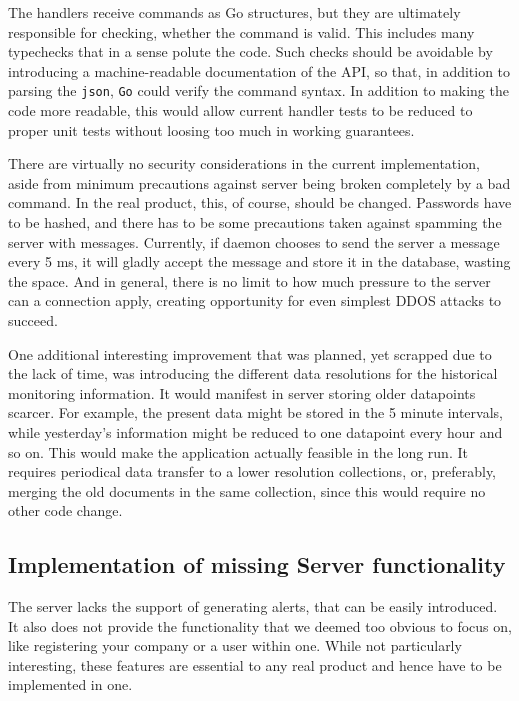 \documentclass{l3proj}
\begin{document}
The handlers receive commands as Go structures, but they are ultimately responsible for checking, whether the command is valid. This includes many typechecks that in a sense polute the code. Such checks should be avoidable by introducing a machine-readable documentation of the API, so that, in addition to parsing the \texttt{json}, \texttt{Go} could verify the command syntax. In addition to making the code more readable, this would allow current handler tests to be reduced to proper unit tests without loosing too much in working guarantees.

There are virtually no security considerations in the current implementation, aside from minimum precautions against server being broken completely by a bad command. In the real product, this, of course, should be changed. Passwords have to be hashed, and there has to be some precautions taken against spamming the server with messages. Currently, if daemon chooses to send the server a message every 5 ms, it will gladly accept the message and store it in the database, wasting the space. And in general, there is no limit to how much pressure to the server can a connection apply, creating opportunity for even simplest DDOS attacks to succeed. 

One additional interesting improvement that was planned, yet scrapped due to the lack of time, was introducing the different data resolutions for the historical monitoring information. It would manifest in server storing older datapoints scarcer. For example, the present data might be stored in the 5 minute intervals, while yesterday's information might be reduced to one datapoint every hour and so on. This would make the application actually feasible in the long run. It requires periodical data transfer to a lower resolution collections, or, preferably, merging the old documents in the same collection, since this would require no other code change.

\subsection{Implementation of missing Server functionality}

The server lacks the support of generating alerts, that can be easily introduced. It also does not provide the functionality that we deemed too obvious to focus on, like registering your company or a user within one. While not particularly interesting, these features are essential to any real product and hence have to be implemented in one.
\end{document}
